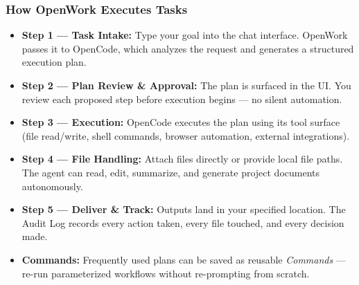 \begin{frame}[fragile]\frametitle{How OpenWork Executes Tasks}
  \begin{itemize}
    \item \textbf{Step 1 — Task Intake:} Type your goal into the chat interface. OpenWork passes it to OpenCode, which analyzes the request and generates a structured execution plan.
    \item \textbf{Step 2 — Plan Review \& Approval:} The plan is surfaced in the UI. You review each proposed step before execution begins — no silent automation.
    \item \textbf{Step 3 — Execution:} OpenCode executes the plan using its tool surface (file read/write, shell commands, browser automation, external integrations).
    \item \textbf{Step 4 — File Handling:} Attach files directly or provide local file paths. The agent can read, edit, summarize, and generate project documents autonomously.
    \item \textbf{Step 5 — Deliver \& Track:} Outputs land in your specified location. The Audit Log records every action taken, every file touched, and every decision made.
    \item \textbf{Commands:} Frequently used plans can be saved as reusable \textit{Commands} — re-run parameterized workflows without re-prompting from scratch.
  \end{itemize}
\end{frame}

